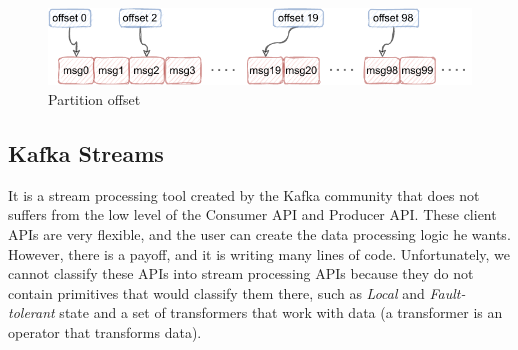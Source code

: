 \begin{enumerate}
    \begin{figure}[!ht]
    \centering
    \includegraphics[scale=1.1]{obrazky-figures/02-preliminaries/02-kafka/05-offset-thing.pdf}
    \caption{Partition offset}
    \label{fig:offset}
    \end{figure}
\end{enumerate}

\subsection{Kafka Streams}

It is a stream processing tool created by the Kafka community that does not suffers from the low level of the Consumer API and Producer API. These client APIs are very flexible, and the user can create the data processing logic he wants. However, there is a payoff, and it is writing many lines of code. Unfortunately, we cannot classify these APIs into stream processing APIs because they do not contain primitives that would classify them there, such as \emph{Local} and \emph{Fault-tolerant} state and a set of transformers that work with data (a transformer is an operator that transforms data).

